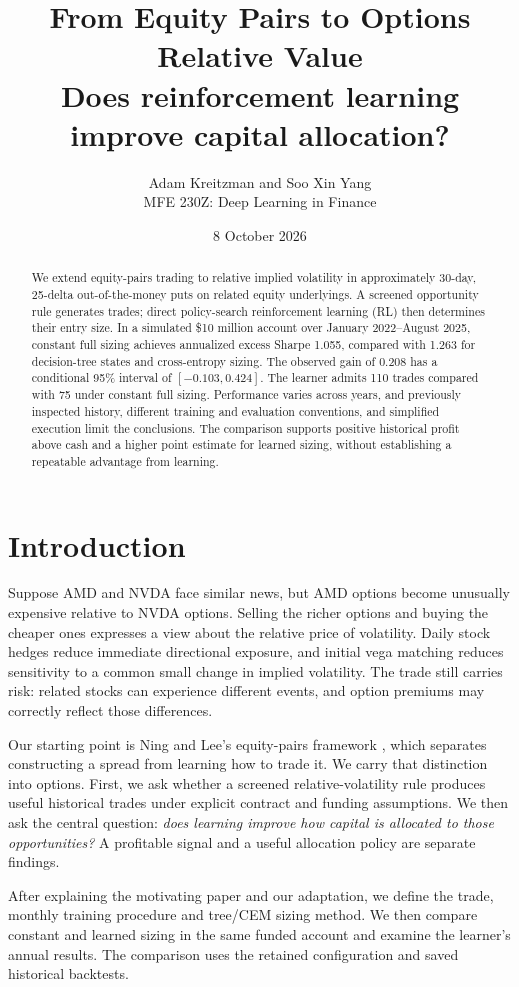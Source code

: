 \documentclass[11pt,letterpaper]{article}
\title{\textbf{From Equity Pairs to Options Relative Value}\\[0.4em]
\large Does reinforcement learning improve capital allocation?}
\author{Adam Kreitzman and Soo Xin Yang\\MFE 230Z: Deep Learning in Finance}
\date{8 October 2026}
\newcommand{\money}[1]{\$#1}
\begin{document}
\maketitle
\begin{abstract}
We extend equity-pairs trading to relative implied volatility in approximately
30-day, 25-delta out-of-the-money puts on related equity underlyings. A screened opportunity rule generates
trades; direct policy-search reinforcement learning (RL) then determines their entry size. In a simulated \money{10 million}
account over January 2022--August 2025, constant full sizing achieves annualized
excess Sharpe 1.055, compared with 1.263 for decision-tree states and cross-entropy
sizing. The observed gain of 0.208 has a conditional 95\% interval of
$[-0.103,0.424]$. The learner admits 110 trades compared with 75 under constant
full sizing. Performance varies across years, and previously inspected history,
different training and evaluation conventions, and simplified execution limit
the conclusions. The comparison supports positive historical profit above cash
and a higher point estimate for learned sizing, without establishing a repeatable
advantage from learning.
\end{abstract}

\section{Introduction}
Suppose AMD and NVDA face similar news, but AMD options become unusually expensive
relative to NVDA options. Selling the richer options and buying the cheaper ones
expresses a view about the relative price of volatility. Daily stock hedges reduce
immediate directional exposure, and initial vega matching reduces sensitivity to
a common small change in implied volatility. The trade still carries risk:
related stocks can experience different events, and option premiums may correctly
reflect those differences.

Our starting point is Ning and Lee's equity-pairs framework \cite{ning}, which
separates constructing a spread from learning how to trade it. We carry that
distinction into options. First, we ask whether a screened relative-volatility
rule produces useful historical trades under explicit contract and funding
assumptions. We then ask the central question: \emph{does learning improve how
capital is allocated to those opportunities?} A profitable signal and a useful
allocation policy are separate findings.

After explaining the motivating paper and our adaptation, we define the trade,
monthly training procedure and tree/CEM sizing method. We then compare constant
and learned sizing in the same funded account and examine the learner's annual
results. The comparison uses the retained configuration and saved historical
backtests.
\end{document}
